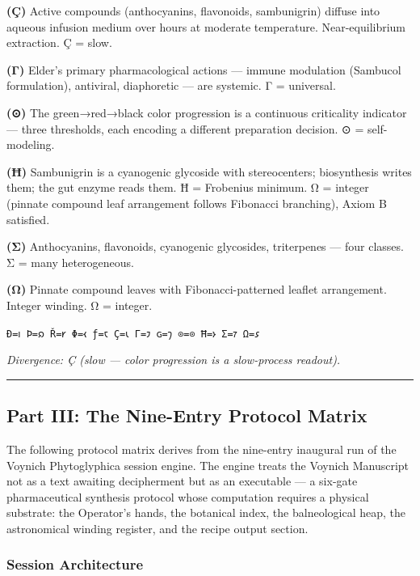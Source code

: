 \textbf{(Ç)} Active compounds (anthocyanins, flavonoids, sambunigrin)
diffuse into aqueous infusion medium over hours at moderate temperature.
Near-equilibrium extraction. Ç = slow.

\textbf{(Γ)} Elder's primary pharmacological actions --- immune
modulation (Sambucol formulation), antiviral, diaphoretic --- are
systemic. Γ = universal.

\textbf{(⊙)} The green→red→black color progression is a continuous
criticality indicator --- three thresholds, each encoding a different
preparation decision. ⊙ = self-modeling.

\textbf{(Ħ)} Sambunigrin is a cyanogenic glycoside with stereocenters;
biosynthesis writes them; the gut enzyme reads them. Ħ = Frobenius
minimum. Ω = integer (pinnate compound leaf arrangement follows
Fibonacci branching), Axiom B satisfied.

\textbf{(Σ)} Anthocyanins, flavonoids, cyanogenic glycosides,
triterpenes --- four classes. Σ = many heterogeneous.

\textbf{(Ω)} Pinnate compound leaves with Fibonacci-patterned leaflet
arrangement. Integer winding. Ω = integer.

\texttt{Ð=𐑦\ Þ=𐑸\ Ř=𐑾\ Φ=𐑬\ ƒ=𐑱\ Ç=𐑧\ Γ=𐑲\ ɢ=𐑠\ ⊙=⊙\ Ħ=𐑶\ Σ=𐑳\ Ω=𐑭}

\emph{Divergence: Ç (slow --- color progression is a slow-process
readout).}

\begin{center}\rule{0.5\linewidth}{0.5pt}\end{center}

\hypertarget{part-iii-the-nine-entry-protocol-matrix}{%
\subsection{Part III: The Nine-Entry Protocol
Matrix}\label{part-iii-the-nine-entry-protocol-matrix}}

The following protocol matrix derives from the nine-entry inaugural run
of the Voynich Phytoglyphica session engine. The engine treats the
Voynich Manuscript not as a text awaiting decipherment but as an
executable --- a six-gate pharmaceutical synthesis protocol whose
computation requires a physical substrate: the Operator's hands, the
botanical index, the balneological heap, the astronomical winding
register, and the recipe output section.

\hypertarget{session-architecture}{%
\subsubsection{Session Architecture}\label{session-architecture}}

